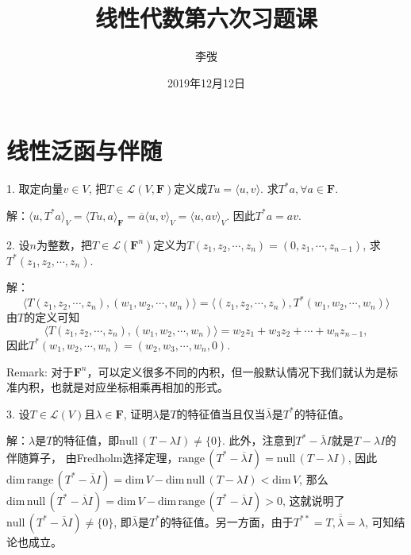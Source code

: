 \documentclass[hyperref,]{ctexart}
\title{线性代数第六次习题课}
\author{李弢}
\date{2019年12月12日}
\begin{document}
\maketitle

{
\setcounter{tocdepth}{2}
\tableofcontents
}
\def\vec{\overrightarrow} \def\bfF{\mathbf{F}} \def\calP{\mathcal{P}}
\def\calC{\mathcal{C}} \def\calL{\mathcal{L}} \def\calM{\mathcal{M}}
\def\R{\mathbb{R}} \def\C{\mathbb{C}} \def\N{\mathbb{N}}
\def\Z{\mathbb{Z}} \def\span{\mathrm{span}\,} \def\dim{\mathrm{dim}\,}
\def\Null{\mathrm{null}\,} \def\range{\mathrm{range}\,}
\def\rank{\mathrm{rank}\,} \def\proj{\mathrm{Proj}\,}
\def\st{\mathrm{s.t.}} \def\d{\mathrm{d}\,}

\section{线性泛函与伴随}\label{ux7ebfux6027ux6cdbux51fdux4e0eux4f34ux968f}

\noindent{} 1. 取定向量\(v\in V\),
把\(T\in\calL(V,\bfF)\)定义成\(Tu = \langle u,v\rangle\).
求\(T^*a,\forall a\in\bfF\).

\smallskip

\noindent{}
解：\(\langle u,T^*a\rangle_V= \langle Tu,a\rangle_{\bfF} =\overline{a}\langle u,v\rangle_V = \langle u,av\rangle_V\).
因此\(T^*a = av\).

\bigskip

\noindent{} 2.
设\(n\)为整数，把\(T\in\calL(\bfF^n)\)定义为\(T(z_1,z_2,\cdots,z_n)=(0,z_1,\cdots,z_{n-1})\),
求\(T^*(z_1,z_2,\cdots,z_n)\).

\smallskip

\noindent{} 解：
\[\langle T(z_1,z_2,\cdots,z_n),(w_1,w_2,\cdots,w_n)\rangle = \langle(z_1,z_2,\cdots,z_n),T^*(w_1,w_2,\cdots,w_n)\rangle\]
由\(T\)的定义可知
\[\langle T(z_1,z_2,\cdots,z_n),(w_1,w_2,\cdots,w_n)\rangle = w_2z_1+w_3z_2+\cdots+w_nz_{n-1},\]
因此\(T^*(w_1,w_2,\cdots,w_n)=(w_2,w_3,\cdots,w_n,0)\).

\smallskip

\noindent{} Remark:
对于\(\bfF^n\)，可以定义很多不同的内积，但一般默认情况下我们就认为是标准内积，也就是对应坐标相乘再相加的形式。

\bigskip

\noindent{} 3. 设\(T\in\calL(V)\)且\(\lambda\in\bfF\),
证明\(\lambda\)是\(T\)的特征值当且仅当\(\overline{\lambda}\)是\(T^*\)的特征值。

\smallskip

\noindent{}
解：\(\lambda\)是\(T\)的特征值，即\(\Null(T-\lambda I)\ne\{0\}\).
此外，注意到\(T^*-\overline{\lambda}I\)就是\(T-\lambda I\)的伴随算子，
由Fredholm选择定理，\(\range(T^*-\overline{\lambda}I) =\Null(T-\lambda I)\),
因此\(\dim \range(T^*-\overline{\lambda}I) = \dim V- \dim \Null(T-\lambda I)<\dim V\),
那么\(\dim \Null(T^*-\overline{\lambda}I) = \dim V-\dim \range(T^*-\overline{\lambda}I)>0\),
这就说明了\(\Null(T^*-\overline{\lambda} I)\ne\{0\}\),
即\(\overline{\lambda}\)是\(T^*\)的特征值。另一方面，由于\(T^{**}=T,\overline{\overline{\lambda}}=\lambda\),
可知结论也成立。
\end{document}
